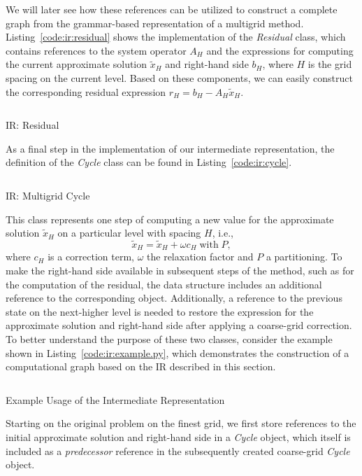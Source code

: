 We will later see how these references can be utilized to construct a complete graph from the grammar-based representation of a multigrid method.
Listing~\ref{code:ir:residual} shows the implementation of the \emph{Residual} class, which contains references to the system operator $A_H$ and the expressions for computing the current approximate solution $\tilde{x}_H$ and right-hand side $b_H$, where $H$ is the grid spacing on the current level.
Based on these components, we can easily construct the corresponding residual expression $r_H = b_H - A_H \tilde{x}_H$.
\begin{listing}
	\inputminted{python}{evostencils/ir/residual.py}
	\caption{IR: Residual}
	\label{code:ir:residual}
\end{listing}
As a final step in the implementation of our intermediate representation, the definition of the \emph{Cycle} class can be found in Listing~\ref{code:ir:cycle}.
\begin{listing}
	\inputminted{python}{evostencils/ir/cycle.py}
	\caption{IR: Multigrid Cycle}
	\label{code:ir:cycle}
\end{listing}
This class represents one step of computing a new value for the approximate solution $\tilde{x}_H$ on a particular level with spacing $H$, i.e.,
\begin{equation}
	\tilde{x}_H = \tilde{x}_H + \omega c_H \; \text{with} \; P,
\end{equation}
where $c_H$ is a correction term, $\omega$ the relaxation factor and $P$ a partitioning.
To make the right-hand side available in subsequent steps of the method, such as for the computation of the residual, the data structure includes an additional reference to the corresponding object.
Additionally, a reference to the previous state on the next-higher level is needed to restore the expression for the approximate solution and right-hand side after applying a coarse-grid correction.
To better understand the purpose of these two classes, consider the example shown in Listing~\ref{code:ir:example.py}, which demonstrates the construction of a computational graph based on the IR described in this section.
\begin{listing}
	\inputminted{python}{evostencils/ir/example.py}
	\caption{Example Usage of the Intermediate Representation}
	\label{code:ir:example.py}
\end{listing}
Starting on the original problem on the finest grid, we first store references to the initial approximate solution and right-hand side in a \emph{Cycle} object, which itself is included as a \emph{predecessor} reference in the subsequently created coarse-grid \emph{Cycle} object.
